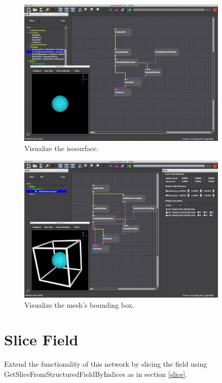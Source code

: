 \documentclass[fleqn,11pt,openany]{book}
\begin{document}
\begin{figure}[H]
\center
\includegraphics[width=0.9\textwidth]{BasicTutorial_figures/viewisocirc.png}
\caption{Visualize the isosurface.}
\label{fig:viewdefaultisosurf}
\end{figure}

\begin{figure}[H]
\center
\includegraphics[width=0.9\textwidth]{BasicTutorial_figures/bbox.png}
\caption{Visualize the mesh's bounding box.}
\label{fig:changeisoval2}
\end{figure}


\section{Slice Field}\label{slice2}

Extend the functionality of this network by slicing the field using GetSliceFromStructuredFieldByIndices as in section \ref{slice}.
\end{document}
